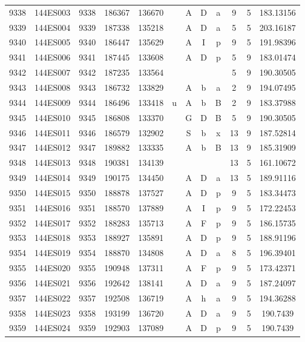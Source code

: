 \begin{tabular}{|*{12}{c|}}
9338 & 144ES003 & 9338 & 186367 & 136670 &  & A & D & a & 9 & 5 & 183.13156 \\ 
9339 & 144ES004 & 9339 & 187338 & 135218 &  & A & D & a & 5 & 5 & 203.16187 \\ 
9340 & 144ES005 & 9340 & 186447 & 135629 &  & A & I & p & 9 & 5 & 191.98396 \\ 
9341 & 144ES006 & 9341 & 187445 & 133608 &  & A & D & p & 5 & 9 & 183.01474 \\ 
9342 & 144ES007 & 9342 & 187235 & 133564 &  &  &  &  & 5 & 9 & 190.30505 \\ 
9343 & 144ES008 & 9343 & 186732 & 133829 &  & A & b & a & 2 & 9 & 194.07495 \\ 
9344 & 144ES009 & 9344 & 186496 & 133418 & u & A & b & B & 2 & 9 & 183.37988 \\ 
9345 & 144ES010 & 9345 & 186808 & 133370 &  & G & D & B & 5 & 9 & 190.30505 \\ 
9346 & 144ES011 & 9346 & 186579 & 132902 &  & S & b & x & 13 & 9 & 187.52814 \\ 
9347 & 144ES012 & 9347 & 189882 & 133335 &  & A & b & B & 13 & 9 & 185.31909 \\ 
9348 & 144ES013 & 9348 & 190381 & 134139 &  &  &  &  & 13 & 5 & 161.10672 \\ 
9349 & 144ES014 & 9349 & 190175 & 134450 &  & A & D & a & 13 & 5 & 189.91116 \\ 
9350 & 144ES015 & 9350 & 188878 & 137527 &  & A & D & p & 9 & 5 & 183.34473 \\ 
9351 & 144ES016 & 9351 & 188570 & 137889 &  & A & I & p & 9 & 5 & 172.22453 \\ 
9352 & 144ES017 & 9352 & 188283 & 135713 &  & A & F & p & 9 & 5 & 186.15735 \\ 
9353 & 144ES018 & 9353 & 188927 & 135891 &  & A & D & p & 9 & 5 & 188.91196 \\ 
9354 & 144ES019 & 9354 & 188870 & 134808 &  & A & D & a & 8 & 5 & 196.39401 \\ 
9355 & 144ES020 & 9355 & 190948 & 137311 &  & A & F & p & 9 & 5 & 173.42371 \\ 
9356 & 144ES021 & 9356 & 192642 & 138141 &  & A & D & a & 9 & 5 & 187.24097 \\ 
9357 & 144ES022 & 9357 & 192508 & 136719 &  & A & h & a & 9 & 5 & 194.36288 \\ 
9358 & 144ES023 & 9358 & 193199 & 136720 &  & A & D & a & 9 & 5 & 190.7439 \\ 
9359 & 144ES024 & 9359 & 192903 & 137089 &  & A & D & p & 9 & 5 & 190.7439 \\ 

\end{tabular}
